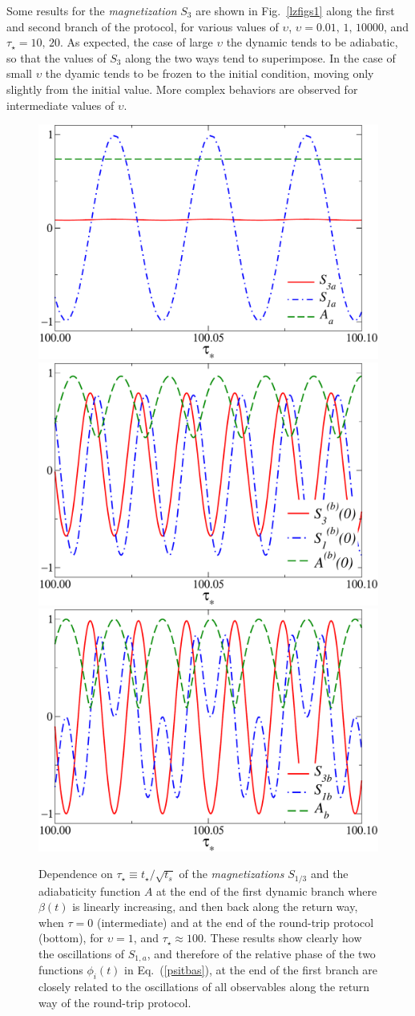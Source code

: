 Some results for the {\em magnetization} $S_3$ are shown in
Fig.~\ref{lzfigs1} along the first and second branch of the protocol,
for various values of $\upsilon$, $\upsilon=0.01,\,1,\,10000$, and
$\tau_\star=10,\,20$. As expected, the case of large $\upsilon$ the
dynamic tends to be adiabatic, so that the values of $S_3$ along the
two ways tend to superimpose.  In the case of small $\upsilon$ the
dyamic tends to be frozen to the initial condition, moving only
slightly from the initial value. More complex behaviors are observed
for intermediate values of $\upsilon$.

\begin{figure}[!htb]
  \centering
  \includegraphics[width=0.55\columnwidth]{imm/oscillationa.pdf}
  \includegraphics[width=0.55\columnwidth]{imm/oscillationb.pdf}
  \includegraphics[width=0.55\columnwidth]{imm/oscillationc.pdf}
  \caption{Dependence on $\tau_\star\equiv t_\star/\sqrt{t_s}$ of the
    {\em magnetizations} $S_{1/3}$ and the adiabaticity function $A$
    at the end of the first dynamic branch where $\beta(t)$
    is linearly increasing, and then back along the return way, when
    $\tau=0$ (intermediate) and at the end of the round-trip protocol
    (bottom), for $\upsilon=1$, and $\tau_\star\approx 100$. These
    results show clearly how the oscillations of $S_{1,a}$, and
    therefore of the relative phase of the two functions $\phi_i(t)$
    in Eq.~(\ref{psitbas}), at the end of the first branch are closely
    related to the oscillations of all observables along the return
    way of the round-trip protocol.  }
  \label{lzfigs}
\end{figure}


